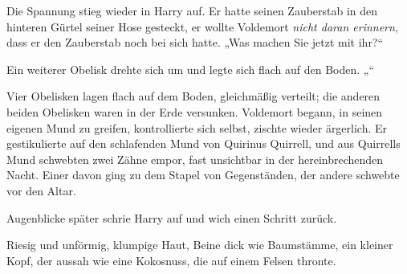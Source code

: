 Die Spannung stieg wieder in Harry auf. Er hatte seinen Zauberstab in den hinteren Gürtel seiner Hose gesteckt, er wollte Voldemort \emph{nicht daran erinnern}, dass er den Zauberstab noch bei sich hatte.
„Was machen Sie jetzt mit ihr?“

Ein weiterer Obelisk drehte sich um und legte sich flach auf den Boden.
„“

Vier Obelisken lagen flach auf dem Boden, gleichmäßig verteilt; die anderen beiden Obelisken waren in der Erde versunken.
Voldemort begann, in seinen eigenen Mund zu greifen, kontrollierte sich selbst, zischte wieder ärgerlich. Er gestikulierte auf den schlafenden Mund von Quirinus Quirrell, und aus Quirrells Mund schwebten zwei Zähne empor, fast unsichtbar in der hereinbrechenden Nacht. Einer davon ging zu dem Stapel von Gegenständen, der andere schwebte vor den Altar.

Augenblicke später schrie Harry auf und wich einen Schritt zurück.

Riesig und unförmig, klumpige Haut, Beine dick wie Baumstämme, ein kleiner Kopf, der aussah wie eine Kokosnuss, die auf einem Felsen thronte.

